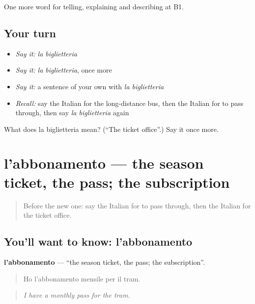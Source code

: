 \begin{grammarlens}[title={What you've built}]
One more word for telling, explaining and describing at B1.
\end{grammarlens}

\subsection*{Your turn}
\begin{itemize}
\raggedright
  \item \emph{Say it:} \emph{la biglietteria}
  \item \emph{Say it:} \emph{la biglietteria}, once more
  \item \emph{Say it:} a sentence of your own with \emph{la biglietteria}
  \item \emph{Recall:} say the Italian for the long-distance bus, then the Italian for to pass through, then say \emph{la biglietteria} again
\end{itemize}

\begin{tcolorbox}[breakable,colback=teal!4,colframe=teal!35!black,title={Before you move on}]
What does la biglietteria mean? (\textquotedblleft{}The ticket office\textquotedblright{}.) Say it once more.
\end{tcolorbox}
\section[l'abbonamento]{l'abbonamento — the season ticket, the pass; the subscription}

\label{lesson:IT-C418-abbonamento}



\begin{quote}
Before the new one: say the Italian for to pass through, then the Italian for the ticket office.
\end{quote}

\subsection*{You'll want to know: l'abbonamento}
\textbf{l'abbonamento} — \textquotedblleft{}the season ticket, the pass; the subscription\textquotedblright{}.

\begin{quote}
Ho l'abbonamento mensile per il tram.
\end{quote}

\begin{quote}
\emph{I have a monthly pass for the tram.}
\end{quote}

